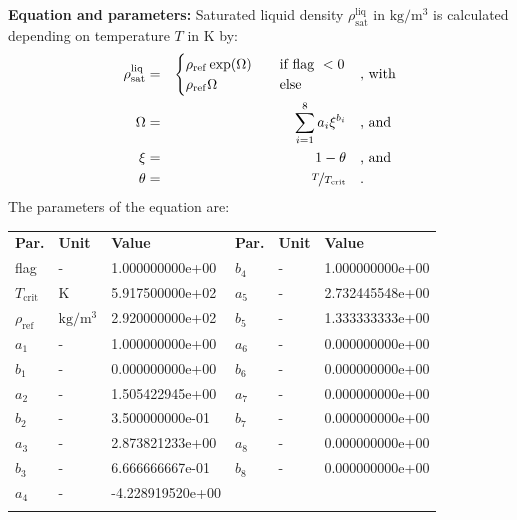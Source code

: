 \textbf{Equation and parameters:}
\newline
%
Saturated liquid density $\rho_\mathrm{sat}^\mathrm{liq}$ in $\si{\kilogram\per\cubic\meter}$ is calculated depending on temperature $T$ in $\si{\kelvin}$ by:
%
\begin{equation*}
\begin{split}
\rho_\mathrm{sat}^\mathrm{liq} &=& \begin{cases} \rho_\mathrm{ref} \exp(\Omega) & \quad \text{if flag } < 0 \\ \rho_\mathrm{ref} \Omega & \quad \text{else} \end{cases} & \quad\text{, with} \\
\Omega &=& \sum_{i=1}^{8} a_i \xi^{b_i} & \quad\text{, and} \\
\xi &=& 1 - \theta & \quad\text{, and} \\
\theta &=& \nicefrac{T}{T_\mathrm{crit}} & \quad\text{.}
\end{split}
\end{equation*}
%
The parameters of the equation are:
%
\begin{longtable}[l]{lll|lll}
\toprule
\addlinespace
\textbf{Par.} & \textbf{Unit} & \textbf{Value} &	\textbf{Par.} & \textbf{Unit} & \textbf{Value} \\
\addlinespace
\midrule
\endhead

\bottomrule
\endfoot
\bottomrule
\endlastfoot
\addlinespace

flag & - & 1.000000000e+00 & $b_4$ & - & 1.000000000e+00 \\
$T_\mathrm{crit}$ & $\si{\kelvin}$ & 5.917500000e+02 & $a_5$ & - & 2.732445548e+00 \\
$\rho_\mathrm{ref}$ & $\si{\kilogram\per\cubic\meter}$ & 2.920000000e+02 & $b_5$ & - & 1.333333333e+00 \\
$a_1$ & - & 1.000000000e+00 & $a_6$ & - & 0.000000000e+00 \\
$b_1$ & - & 0.000000000e+00 & $b_6$ & - & 0.000000000e+00 \\
$a_2$ & - & 1.505422945e+00 & $a_7$ & - & 0.000000000e+00 \\
$b_2$ & - & 3.500000000e-01 & $b_7$ & - & 0.000000000e+00 \\
$a_3$ & - & 2.873821233e+00 & $a_8$ & - & 0.000000000e+00 \\
$b_3$ & - & 6.666666667e-01 & $b_8$ & - & 0.000000000e+00 \\
$a_4$ & - & -4.228919520e+00 & & & \\

\addlinespace\end{longtable}

